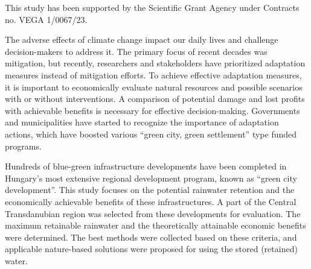 This study has been supported by the Scientific Grant Agency under Contracts no. VEGA 1/0067/23.





\newpage{}
{}
\begin{flushleft}





\end{flushleft}

\noindent

The adverse effects of climate change impact our daily lives and challenge decision-makers to address it. The primary focus of recent decades was mitigation, but recently, researchers and stakeholders have prioritized adaptation measures instead of mitigation efforts. To achieve effective adaptation measures, it is important to economically evaluate natural resources and possible scenarios with or without interventions. A comparison of potential damage and lost profits with achievable benefits is necessary for effective decision-making. Governments and municipalities have started to recognize the importance of adaptation actions, which have boosted various ``green city, green settlement'' type funded programs.

Hundreds of blue-green infrastructure developments have been completed in Hungary's most extensive regional development program, known as ``green city development''. This study focuses on the potential rainwater retention and the economically achievable benefits of these infrastructures. A part of the Central Transdanubian region was selected from these developments for evaluation. The maximum retainable rainwater and the theoretically attainable economic benefits were determined. The best methods were collected based on these criteria, and applicable nature-based solutions were proposed for using the stored (retained) water. 

